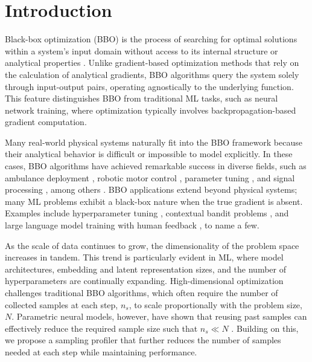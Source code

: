 \section{Introduction} \label{intro}
Black-box optimization (BBO) is the process of searching for optimal solutions within a system's input domain without access to its internal structure or analytical properties \cite{audet2017introduction}. Unlike gradient-based optimization methods that rely on the calculation of analytical gradients, BBO algorithms query the system solely through input-output pairs, operating agnostically to the underlying function. This feature distinguishes BBO from traditional ML tasks, such as neural network training, where optimization typically involves backpropagation-based gradient computation.

Many real-world physical systems naturally fit into the BBO framework because their analytical behavior is difficult or impossible to model explicitly. In these cases, BBO algorithms have achieved remarkable success in diverse fields, such as ambulance deployment \cite{zhen2014simulation}, robotic motor control \cite{gehring2014towards, prabhu2018survey}, parameter tuning \cite{olof2018comparative, rimon2024mamba}, and signal processing \cite{zoReview}, among others \cite{alarie2021two}. BBO applications extend beyond physical systems; many ML problems exhibit a black-box nature when the true gradient is absent. Examples include hyperparameter tuning \cite{bischl2023hyperparameter}, contextual bandit problems \cite{bouneffouf2020survey}, and large language model training with human feedback \cite{bai2022training}, to name a few.

As the scale of data continues to grow, the dimensionality of the problem space increases in tandem. This trend is particularly evident in ML, where model architectures, embedding and latent representation sizes, and the number of hyperparameters are continually expanding. High-dimensional optimization challenges traditional BBO algorithms, which often require the number of collected samples at each step, $n_s$, to scale proportionally with the problem size, $N$. Parametric neural models, however, have shown that reusing past samples can effectively reduce the required sample size such that $n_s \ll N$ \cite{sarafian2020explicit,lu2023opt}. Building on this, we propose a sampling profiler that further reduces the number of samples needed at each step while maintaining performance.

